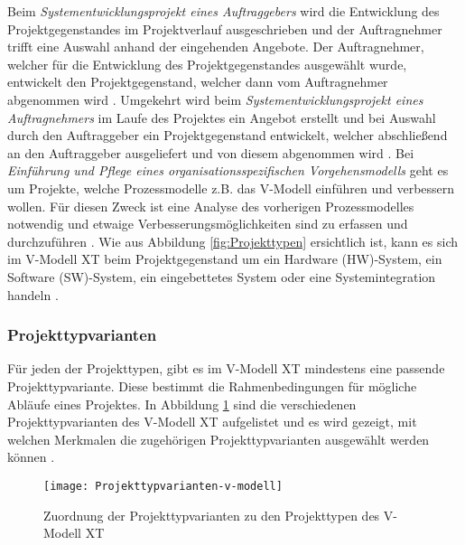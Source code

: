 Beim \textit{Systementwicklungsprojekt eines Auftraggebers} wird die Entwicklung des Projektgegenstandes im Projektverlauf  ausgeschrieben und der Auftragnehmer trifft eine Auswahl anhand der eingehenden Angebote. Der Auftragnehmer, welcher für die Entwicklung des Projektgegenstandes ausgewählt wurde, entwickelt den Projektgegenstand, welcher dann vom Auftragnehmer abgenommen wird \cite{reinhard2008,2004vmodell}.\newline
Umgekehrt wird beim \textit{Systementwicklungsprojekt eines Auftragnehmers} im Laufe des Projektes ein Angebot erstellt und bei Auswahl durch den Auftraggeber ein Projektgegenstand entwickelt, welcher abschließend an den Auftraggeber ausgeliefert und von diesem abgenommen wird \cite{reinhard2008,2004vmodell}.\newline
Bei \textit{Einführung und Pflege eines organisationsspezifischen Vorgehensmodells} geht es um Projekte, welche Prozessmodelle z.B. das V-Modell einführen und verbessern wollen. Für diesen Zweck ist eine Analyse des vorherigen Prozessmodelles notwendig und etwaige Verbesserungsmöglichkeiten sind zu erfassen und durchzuführen \cite{reinhard2008,2004vmodell}.\newline
Wie aus Abbildung \ref{fig:Projekttypen} ersichtlich ist, kann es sich im V-Modell XT beim Projektgegenstand um ein Hardware (HW)-System, ein Software (SW)-System, ein eingebettetes System oder eine Systemintegration handeln \cite{brack2010,2004vmodell}. \newline

\subsubsection{Projekttypvarianten}
Für jeden der Projekttypen, gibt es im V-Modell XT mindestens eine passende Projekttypvariante. Diese bestimmt die Rahmenbedingungen für mögliche Abläufe eines Projektes. In Abbildung \ref{fig:Projekttypvarianten} sind die verschiedenen Projekttypvarianten des V-Modell XT aufgelistet und es wird gezeigt, mit welchen Merkmalen die zugehörigen Projekttypvarianten ausgewählt werden können \cite{2004vmodell}.   
\begin{figure}[htp]
\begin{center}
  \texttt{[image: Projekttypvarianten-v-modell]} %
  \caption{Zuordnung der Projekttypvarianten zu den Projekttypen des V-Modell XT \cite{2004vmodell}}
  \label{fig:Projekttypvarianten}
\end{center}
\end{figure}


